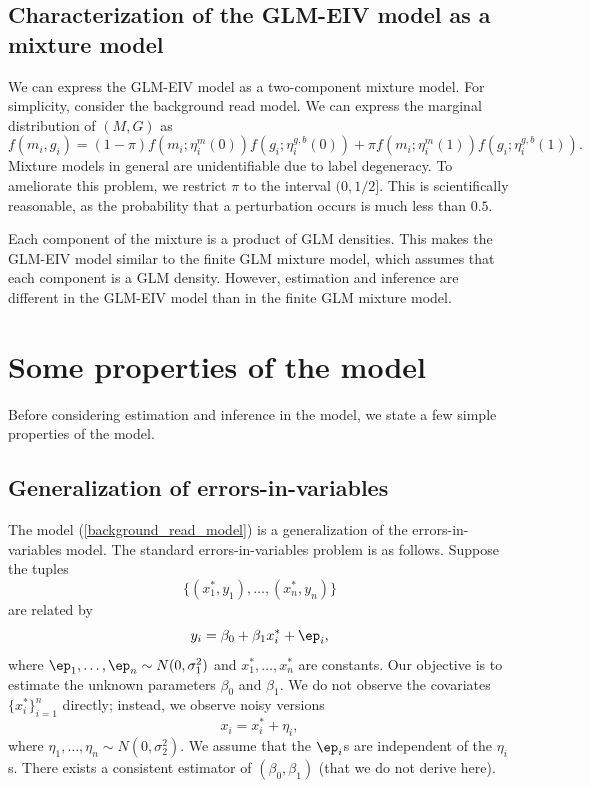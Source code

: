 \documentclass[12pt]{article}
\begin{document}
\subsection{Characterization of the GLM-EIV model as a mixture model}

We can express the GLM-EIV model as a two-component mixture model. For simplicity, consider the background read model. We can express the marginal distribution of $(M, G)$ as
$$
f(m_i, g_i) = (1 - \pi) f(m_i; \eta^{m}_i(0) ) f(g_i; \eta^{g, b}_i(0) ) + \pi f(m_i;\eta^{m}_i(1)) f(g_i;\eta^{g, b}_i(1)).
$$
Mixture models in general are unidentifiable due to label degeneracy. To ameliorate this problem, we restrict $\pi$ to the interval $(0, 1/2]$. This is scientifically reasonable, as the probability that a perturbation occurs is much less than $0.5$.

Each component of the mixture is a product of GLM densities. This makes the GLM-EIV model similar to the finite GLM mixture model, which assumes that each component is a GLM density. However, estimation and inference are different in the GLM-EIV model than in the finite GLM mixture model.

\section{Some properties of the model}

Before considering estimation and inference in the model, we state a few simple properties of the model.

\subsection{Generalization of errors-in-variables}

The model (\ref{background_read_model}) is a generalization of the errors-in-variables model. The standard errors-in-variables problem is as follows. Suppose the tuples $$\{(x^*_1, y_1),  \dots, (x^*_n, y_n)\}$$ are related by
\begin{equation}\label{eiv1} y_i = \beta_0 + \beta_1 x^*_i + \ep_i,\end{equation} where $\ep_1, \dots, \ep_n \sim N(0, \sigma_1^2)$ and $x^*_1, \dots, x^*_n$ are constants. Our objective is to estimate the unknown parameters $\beta_0$  and $\beta_1$. We do not observe the covariates $\{ x^*_i \}_{i=1}^n$ directly; instead, we observe noisy versions
\begin{equation}\label{eiv2} x_i = x^*_i + \eta_i, \end{equation} where $\eta_1, \dots, \eta_n \sim N(0,\sigma_2^2)$. We assume that the $\ep_i$s are independent of the $\eta_i$s. There exists a consistent estimator of $(\beta_0, \beta_1)$ (that we do not derive here).
\end{document}
